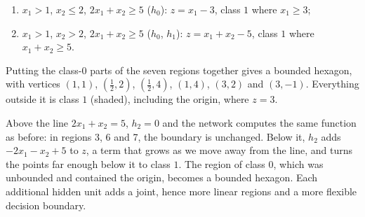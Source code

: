 \documentclass[11pt, a4paper]{exam}
\begin{document}
\begin{exercises}
\begin{parts}
\begin{solution}
\begin{enumerate}
            \item $x_1 > 1$, $x_2 \leq 2$, $2x_1 + x_2 \geq 5$ ($h_0$): $z = x_1 - 3$, class $1$ where $x_1 \geq 3$;
            \item $x_1 > 1$, $x_2 > 2$, $2x_1 + x_2 \geq 5$ ($h_0$, $h_1$): $z = x_1 + x_2 - 5$, class $1$ where $x_1 + x_2 \geq 5$.
        \end{enumerate}
        Putting the class-$0$ parts of the seven regions together gives a bounded hexagon, with vertices $(1, 1)$, $(\frac{1}{2}, 2)$, $(\frac{1}{2}, 4)$, $(1, 4)$, $(3, 2)$ and $(3, -1)$. Everything outside it is class $1$ (shaded), including the origin, where $z = 3$.
        \begin{center}
        \end{center}
        Above the line $2x_1 + x_2 = 5$, $h_2 = 0$ and the network computes the same function as before: in regions 3, 6 and 7, the boundary is unchanged. Below it, $h_2$ adds $-2x_1 - x_2 + 5$ to $z$, a term that grows as we move away from the line, and turns the points far enough below it to class $1$. The region of class $0$, which was unbounded and contained the origin, becomes a bounded hexagon. Each additional hidden unit adds a joint, hence more linear regions and a more flexible decision boundary.
    \end{solution}
\end{parts}


\end{exercises}
\end{document}
